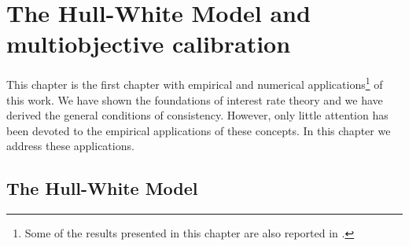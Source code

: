 \chapter{The Hull-White Model and multiobjective calibration}  
This chapter is the first chapter with empirical and numerical
applications\footnote{Some of the results presented in this chapter are also
  reported in \cite{FNN:2009}.} of this work. We have shown the
foundations of interest rate theory and we have derived the general
conditions of consistency. However, only little attention has been
devoted to the empirical applications of these concepts. In this
chapter we address these applications. 
\section{The Hull-White Model}



